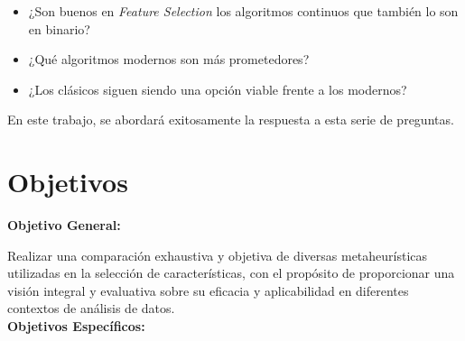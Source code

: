 \begin{itemize}
      \item ¿Son buenos en \textit{Feature Selection} los algoritmos continuos que también lo son en binario?
      \item ¿Qué algoritmos modernos son más prometedores?
      \item ¿Los clásicos siguen siendo una opción viable frente a los modernos?
\end{itemize}

En este trabajo, se abordará exitosamente la respuesta a esta serie de preguntas.

\section{Objetivos}\label{sec:objetivos}
\textbf{Objetivo General:}

Realizar una comparación exhaustiva y objetiva de diversas metaheurísticas utilizadas en la
selección de características, con el propósito de proporcionar una visión integral y
evaluativa sobre su eficacia y aplicabilidad en diferentes contextos de análisis de
datos.\\[6pt]
\textbf{Objetivos Específicos:}

